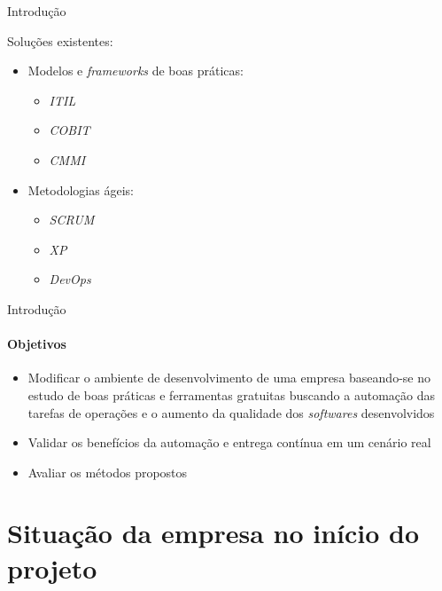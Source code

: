 \documentclass[aspectratio=169]{beamer}
\begin{document}
\begin{frame}{Introdução}
	
	Soluções existentes:
	
	\begin{itemize}
		
		\item Modelos e \textit{frameworks} de boas práticas:
		
		\begin{itemize}
			\item \textit{ITIL}
			\item \textit{COBIT} 
			\item \textit{CMMI} 
		\end{itemize}
		
		\item Metodologias ágeis:
		
		\begin{itemize}
			\item \textit{SCRUM}
			\item \textit{XP}
			\item \textit{DevOps}
		\end{itemize}
		
	\end{itemize}
	
\end{frame}

\begin{frame}{Introdução}
	
	\framesubtitle{Objetivos}
	
	\begin{itemize}
		
		\item Modificar o ambiente de desenvolvimento de uma empresa baseando-se no estudo de boas práticas e ferramentas gratuitas buscando a automação das tarefas de operações e o aumento da qualidade dos \textit{softwares} desenvolvidos
		
		\item Validar os benefícios da automação e entrega contínua em um cenário real
		
		\item Avaliar os métodos propostos
		
	\end{itemize}
	
\end{frame}


\section{Situação da empresa no início do projeto}
\end{document}
